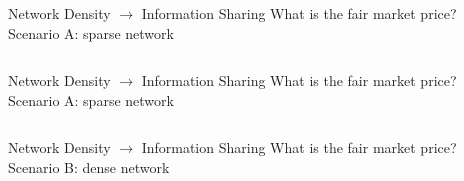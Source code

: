 \documentclass[notes, aspectratio=1610]{beamer}
\begin{document}
\begin{frame}
	{Network Density $\rightarrow$ Information Sharing}
	{What is the fair market price? Scenario A: sparse network}
	\centering
	\begin{columns}
		\begin{column}{0.5\textwidth}
			
		\end{column}
		\begin{column}{0.5\textwidth}
			
		\end{column}
	\end{columns}
\end{frame}

\begin{frame}
	{Network Density $\rightarrow$ Information Sharing}
	{What is the fair market price? Scenario A: sparse network}
	\centering
	\begin{columns}
		\begin{column}{0.5\textwidth}
			
		\end{column}
		\begin{column}{0.45\textwidth}
			
		\end{column}
	\end{columns}
\end{frame}

\begin{frame}
	{Network Density $\rightarrow$ Information Sharing}
	{What is the fair market price? Scenario B: dense network}
	\centering
	\begin{columns}
		\begin{column}{0.5\textwidth}
			
		\end{column}
		\begin{column}{0.45\textwidth}
			
		\end{column}
	\end{columns}
\end{frame}
\end{document}
